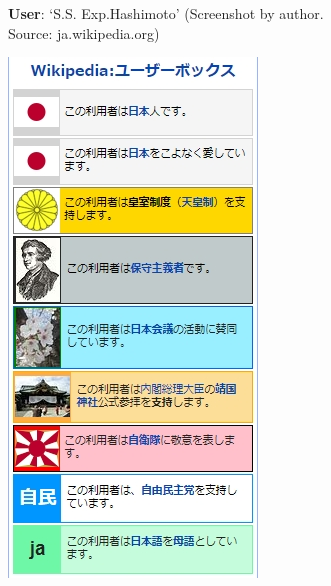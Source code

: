 \documentclass[10pt,british,A4paper,,openany]{memoir}
\begin{document}
\begin{figure}[!htb]
\begin{subfigure}[b]{0.3\textwidth}
  \caption{\textbf{User}: `S.S. Exp.Hashimoto' (Screenshot by author. Source: ja.wikipedia.org)}
  \label{fig:hashimoto}
 \end{subfigure}
  \begin{subfigure}[b]{0.3\textwidth}
  \includegraphics[width=\textwidth]{images/wiki/defense-corps.jpg}

\end{subfigure}
\end{figure}
\end{document}
